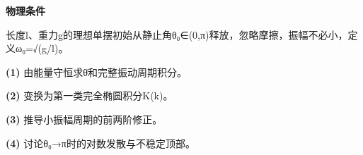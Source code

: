 \textbf{物理条件}\par 长度l、重力g的理想单摆初始从静止角θ₀∈(0,π)释放，忽略摩擦，振幅不必小，定义ω₀=√(g/l)。
\par\noindent\textbf{(1)} 由能量守恒求θ̇和完整振动周期积分。
\par\noindent\textbf{(2)} 变换为第一类完全椭圆积分K(k)。
\par\noindent\textbf{(3)} 推导小振幅周期的前两阶修正。
\par\noindent\textbf{(4)} 讨论θ₀→π时的对数发散与不稳定顶部。
